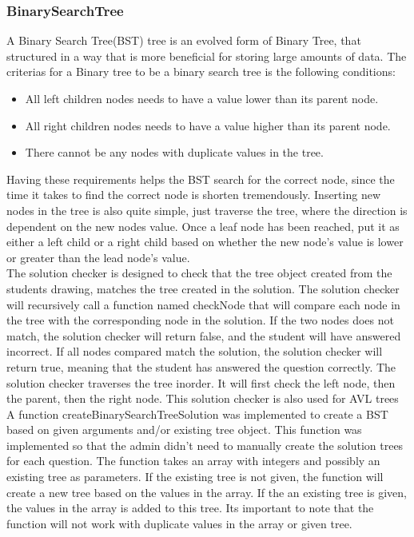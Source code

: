 \subsubsection{BinarySearchTree}
A Binary Search Tree(BST) tree is an evolved form of Binary Tree, that structured in a way that is more beneficial for storing large amounts of data. The criterias for a Binary tree to be a binary search tree is the following conditions:
\begin{itemize}
	\item{All left children nodes needs to have a value lower than its parent node.}
	\item{All right children nodes needs to have a value higher than its parent node.}
	\item{There cannot be any nodes with duplicate values in the tree.}
\end{itemize}
Having these requirements helps the BST search for the correct node, since the time it takes to find the correct node is shorten tremendously. Inserting new nodes in the tree is also quite simple, just traverse the tree, where the direction is dependent on the new nodes value. Once a leaf node has been reached, put it as either a left child or a right child based on whether the new node's value is lower or greater than the lead node's value.
\\[11pt]
The solution checker is designed to check that the tree object created from the students drawing, matches the tree created in the solution. The solution checker will recursively call a function named checkNode that will compare each node in the tree with the corresponding node in the solution. If the two nodes does not match, the solution checker will return false, and the student will have answered incorrect. If all nodes compared match the solution, the solution checker will return true, meaning that the student has answered the question correctly. The solution checker traverses the tree inorder. It will first check the left node, then the parent, then the right node. This solution checker is also used for AVL trees%
\\[11pt]
A function createBinarySearchTreeSolution was implemented to create a BST based on given arguments and/or existing tree object. This function was implemented so that the admin didn't need to manually create the solution trees for each question. The function takes an array with integers and possibly an existing tree as parameters. If the existing tree is not given, the function will create a new tree based on the values in the array. If the an existing tree is given, the values in the array is added to this tree. Its important to note that the function will not work with duplicate values in the array or given tree. \\
